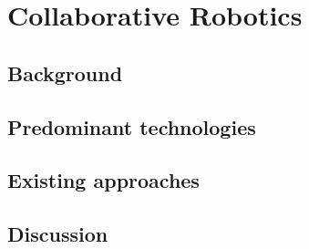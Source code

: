 \chapter{Collaborative Robotics}

\section{Background}

\section{Predominant technologies}

\section{Existing approaches}

\section{Discussion}

